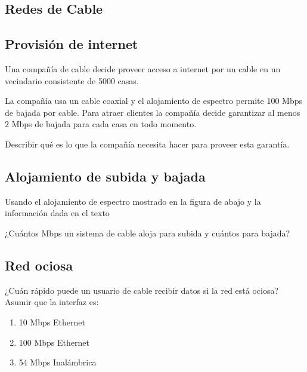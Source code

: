 \documentclass[12pt]{report}
\begin{document}
\begin{exer}
\section{Redes de Cable}
\subsection{Provisión de internet \stwo}
Una compañía de cable decide proveer acceso a internet por un cable en un vecindario consistente de 5000 casas.

La compañía usa un cable coaxial y el alojamiento de espectro permite 100 Mbps de bajada por cable. Para atraer clientes la compañía decide garantizar al menos 2 Mbps de bajada para cada casa en todo momento.

Describir qué es lo que la compañía necesita hacer para proveer esta garantía.
\end{exer}

\begin{exer}
\subsection{Alojamiento de subida y bajada \sthree}
Usando el alojamiento de espectro mostrado en la figura de abajo y la información
dada en el texto


¿Cuántos Mbps un sistema de cable aloja para subida y cuántos para bajada?
\end{exer}

\begin{exer}
\subsection{Red ociosa \sthree}
¿Cuán rápido puede un usuario de cable recibir datos si la red está ociosa? Asumir
que la interfaz es:

\begin{enumerate}
\item 10 Mbps Ethernet
\item 100 Mbps Ethernet
\item 54 Mbps Inalámbrica
\end{enumerate}
\end{exer}
\end{document}
